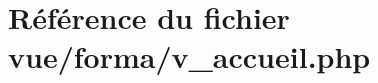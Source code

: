 \hypertarget{v__accueil_8php}{}\section{Référence du fichier vue/forma/v\+\_\+accueil.php}
\label{v__accueil_8php}
